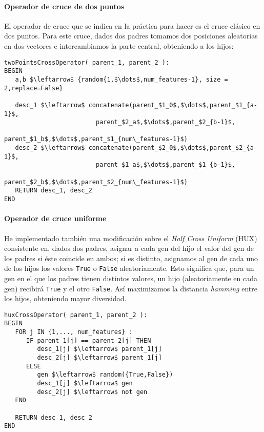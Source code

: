 \documentclass[11pt,leqno]{article}
\begin{document}
\paragraph{Operador de cruce de dos puntos}

	El operador de cruce que se indica en la práctica para hacer es el cruce clásico en dos puntos. Para este cruce, dados dos padres tomamos dos posiciones aleatorias en dos vectores e intercambiamos la parte central, obteniendo a los hijos:
	
\begin{lstlisting}[mathescape=true]
twoPointsCrossOperator( parent_1, parent_2 ):
BEGIN
   a,b $\leftarrow$ {random{1,$\dots$,num_features-1}, size = 2,replace=False}

   desc_1 $\leftarrow$ concatenate(parent_$1_0$,$\dots$,parent_$1_{a-1}$,
                         parent_$2_a$,$\dots$,parent_$2_{b-1}$,
                         parent_$1_b$,$\dots$,parent_$1_{num\_features-1}$)
   desc_2 $\leftarrow$ concatenate(parent_$2_0$,$\dots$,parent_$2_{a-1}$,
                         parent_$1_a$,$\dots$,parent_$1_{b-1}$,
                         parent_$2_b$,$\dots$,parent_$2_{num\_features-1}$)
   RETURN desc_1, desc_2
END

\end{lstlisting}
	
\paragraph{Operador de cruce uniforme}

	He implementado también una modificación sobre el \textit{Half Cross Uniform} (HUX) consistente en, dados dos padres, asignar a cada gen del hijo el valor del gen de los padres si éste coincide en ambos; si es distinto, asignamos al gen de cada uno de los hijos los valores \texttt{True} o \texttt{False} aleatoriamente. Esto significa que, para un gen en el que los padres tienen distintos valores, un hijo (aleatoriamente en cada gen) recibirá \texttt{True} y el otro \texttt{False}. Así maximizamos la distancia \textit{hamming} entre los hijos, obteniendo mayor diversidad. 
	
\begin{lstlisting}[mathescape=true]
huxCrossOperator( parent_1, parent_2 ):
BEGIN
   FOR j IN {1,..., num_features} :
      IF parent_1[j] == parent_2[j] THEN
         desc_1[j] $\leftarrow$ parent_1[j]
         desc_2[j] $\leftarrow$ parent_1[j]
      ELSE
         gen $\leftarrow$ random({True,False})
         desc_1[j] $\leftarrow$ gen     
         desc_2[j] $\leftarrow$ not gen
   END
   
   RETURN desc_1, desc_2
END
\end{lstlisting}
	
\end{document}
